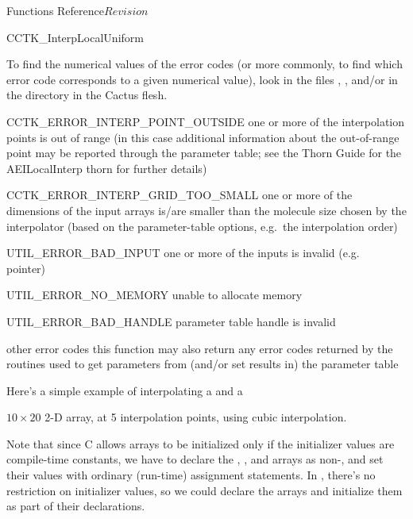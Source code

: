 \begin{cactuspart}{ Functions Reference}{}{$Revision$}
\begin{FunctionDescription}{CCTK\_InterpLocalUniform}
\begin{ErrorSection}
\begin{Error}{}
To find the numerical
values of the error codes (or more commonly, to find which error code
corresponds to a given numerical value), look in the files
, , and/or 
in the  directory in the Cactus flesh.
\end{Error}
\begin{Error}{CCTK\_ERROR\_INTERP\_POINT\_OUTSIDE}
one or more of the interpolation points is out of range
(in this case additional information about the out-of-range point
may be reported through the parameter table; see the Thorn Guide for
the AEILocalInterp thorn for further details)
\end{Error}
\begin{Error}{CCTK\_ERROR\_INTERP\_GRID\_TOO\_SMALL}
one or more of the dimensions of the input arrays is/are smaller than
the molecule size chosen by the interpolator (based on the parameter-table
options, e.g.\ the interpolation order)
\end{Error}
\begin{Error}{UTIL\_ERROR\_BAD\_INPUT}
one or more of the inputs is invalid (e.g.~ pointer)
\end{Error}
\begin{Error}{UTIL\_ERROR\_NO\_MEMORY}
unable to allocate memory
\end{Error}
\begin{Error}{UTIL\_ERROR\_BAD\_HANDLE}
parameter table handle is invalid
\end{Error}
\begin{Error}{other error codes}
this function may also return any error codes returned by the
 routines used to get parameters from
(and/or set results in) the parameter table
\end{Error}
\end{ErrorSection}

\begin{ExampleSection}
\begin{ExampleDescription}
Here's a simple example of interpolating a  and a
\end{ExampleDescription}
 $10 \times 20$ 2-D array, at 5 interpolation points,
using cubic interpolation.

Note that since C allows arrays to be initialized only if the
initializer values are compile-time constants, we have to declare the
, , and 
arrays as non-, and set their values with ordinary (run-time)
assignment statements.  In \Cplusplus, there's no restriction on
initializer values, so we could declare the arrays  and
initialize them as part of their declarations.


\end{ExampleSection}
\end{FunctionDescription}
\end{cactuspart}
